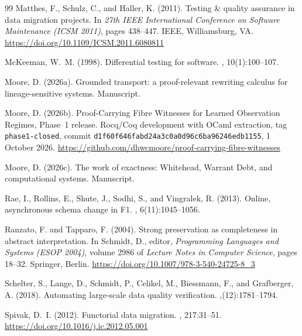 \documentclass[11pt]{article}
\theoremstyle{definition}
\newcommand{\code}[1]{\texttt{#1}}
\begin{document}
\begin{thebibliography}{99}
Matthes, F., Schulz, C., and Haller, K. (2011).
\newblock Testing \& quality assurance in data migration projects.
\newblock In {\em 27th IEEE International Conference on Software Maintenance
  (ICSM 2011)}, pages 438--447. IEEE, Williamsburg, VA.
\newblock \url{https://doi.org/10.1109/ICSM.2011.6080811}

McKeeman, W.~M. (1998).
\newblock Differential testing for software.
, 10(1):100--107.

Moore, D. (2026a).
\newblock Grounded transport: a proof-relevant rewriting calculus for lineage-sensitive systems.
\newblock Manuscript.

Moore, D. (2026b).
\newblock Proof-Carrying Fibre Witnesses for Learned Observation Regimes, Phase~1 release.
\newblock Rocq/Coq development with OCaml extraction, tag \code{phase1-closed},
  commit \code{d1f60f646fabd24a3c0a0d96c6ba96246edb1155}, 1 October 2026.
\newblock \url{https://github.com/dhwcmoore/proof-carrying-fibre-witnesses}

Moore, D. (2026c).
\newblock The work of exactness: Whitehead, Warrant Debt, and computational systems.
\newblock Manuscript.

Rae, I., Rollins, E., Shute, J., Sodhi, S., and Vingralek, R. (2013).
\newblock Online, asynchronous schema change in {F1}.
, 6(11):1045--1056.

Ranzato, F. and Tapparo, F. (2004).
\newblock Strong preservation as completeness in abstract interpretation.
\newblock In Schmidt, D., editor, {\em Programming Languages and Systems (ESOP
  2004)}, volume 2986 of {\em Lecture Notes in Computer Science}, pages 18--32.
  Springer, Berlin.
\newblock \url{https://doi.org/10.1007/978-3-540-24725-8_3}

Schelter, S., Lange, D., Schmidt, P., Celikel, M., Biessmann, F., and Grafberger, A. (2018).
\newblock Automating large-scale data quality verification.
,(12):1781--1794.

Spivak, D.~I. (2012).
\newblock Functorial data migration.
, 217:31--51.
\newblock \url{https://doi.org/10.1016/j.ic.2012.05.001}


\end{thebibliography}
\end{document}
